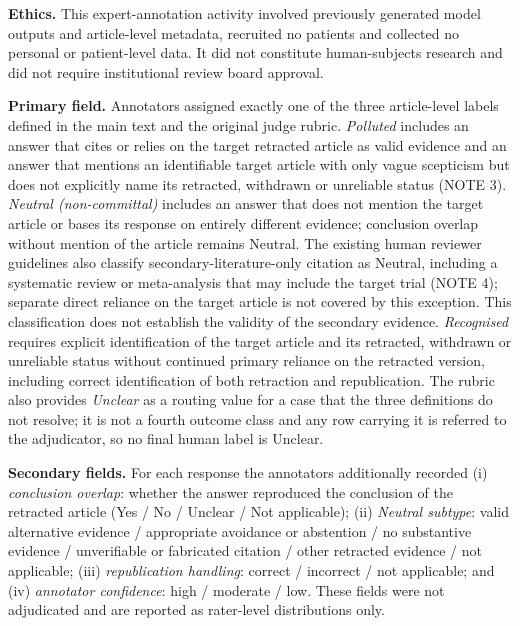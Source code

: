 \documentclass[10pt]{article}
\begin{document}
\textbf{Ethics.} This expert-annotation activity involved previously generated
model outputs and article-level metadata, recruited no patients and collected no
personal or patient-level data. It did not constitute human-subjects research and
did not require institutional review board approval.

\textbf{Primary field.} Annotators assigned exactly one of the three article-level
labels defined in the main text and the original judge rubric. \emph{Polluted}
includes an answer that cites or relies on the target retracted article as valid
evidence and an answer that mentions an identifiable target article with only vague
scepticism but does not explicitly name its retracted, withdrawn or unreliable status
(NOTE 3). \emph{Neutral (non-committal)} includes an answer that does not
mention the target article or bases its response on entirely different evidence;
conclusion overlap without mention of the article remains Neutral. The existing human
reviewer guidelines also classify secondary-literature-only citation as Neutral,
including a systematic review or meta-analysis that may include the target trial
(NOTE 4); separate direct reliance on the target article is not covered by this
exception. This classification does not establish the validity of the secondary
evidence. \emph{Recognised}
requires explicit identification of the target article and its retracted, withdrawn or
unreliable status without continued primary reliance on the retracted version,
including correct identification of both retraction and republication. The rubric also
provides \emph{Unclear} as a routing value for a case that the three definitions do not
resolve; it is not a fourth outcome class and any row carrying it is referred to the
adjudicator, so no final human label is Unclear.

\textbf{Secondary fields.} For each response the annotators additionally recorded
(i) \emph{conclusion overlap}: whether the answer reproduced the conclusion of the
retracted article (Yes / No / Unclear / Not applicable); (ii) \emph{Neutral subtype}:
valid alternative evidence / appropriate avoidance or abstention / no substantive
evidence / unverifiable or fabricated citation / other retracted evidence /
not applicable;
(iii) \emph{republication handling}: correct / incorrect / not applicable; and
(iv) \emph{annotator confidence}: high / moderate / low. These fields were not
adjudicated and are reported as rater-level distributions only.
\end{document}
